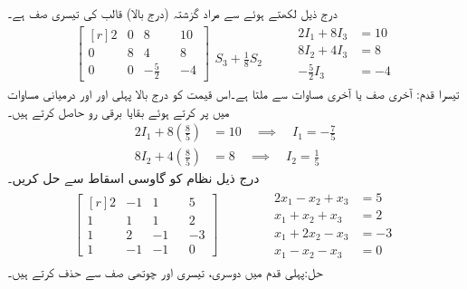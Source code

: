درج ذیل لکھتے ہوئے  سے مراد گزشتہ (درج بالا) قالب کی تیسری صف  ہے۔
\begin{gather*}
\begin{bmatrix*}[r]2&0&8&&10\\0&8&4&&8\\
0&0&-\frac{5}{2}&&-4  \end{bmatrix*}\begin{matrix} \\ \\ S_3+\frac{1}{8}S_2 \end{matrix} \quad \quad 
\begin{aligned}
2I_1+8I_3&=10\\
8I_2+4I_3&=8\\
-\frac{5}{2}I_3&=-4
\end{aligned}
\end{gather*}
تیسرا قدم: آخری صف یا آخری مساوات سے  ملتا ہے۔اس قیمت کو درج بالا پہلی اور  اور درمیانی مساوات  میں پر کرتے ہوئے بقایا برقی رو حاصل کرتے ہیں۔
\begin{align*}
2I_1+8\left(\frac{8}{5}\right)&=10\quad \implies \quad I_1=-\frac{7}{5}\\
8I_2+4\left(\frac{8}{5}\right)&=8\quad \implies \quad I_2=\frac{1}{5}
\end{align*}
درج ذیل نظام کو گاوسی اسقاط سے حل کریں۔
\begin{gather*}
\begin{bmatrix*}[r]
2&-1&1&&5\\
1&1&1&&2\\
1&2&-1&&-3\\
1&-1&-1&&0
\end{bmatrix*}\quad\quad\quad \quad
\begin{aligned}
2x_1-x_2+x_3&=5\\
x_1+x_2+x_3&=2\\
x_1+2x_2-x_3&=-3\\
x_1-x_2-x_3&=0
\end{aligned}
\end{gather*}
حل:پہلی قدم میں دوسری، تیسری اور چوتھی صف سے  حذف کرتے ہیں۔
